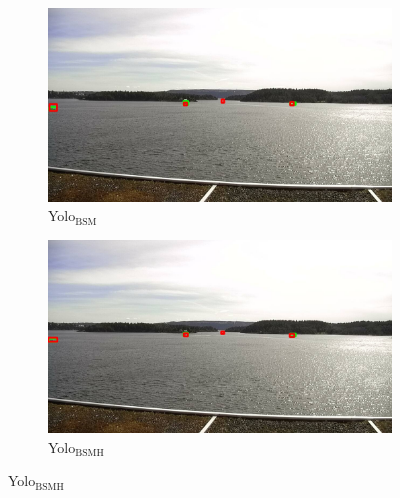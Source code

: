 \begin{figure}[h!]
\begin{subfigure}{.5\textwidth}
  \centering
  \includegraphics[width=0.9\linewidth]{results/case_buildings/yolo23/samemistake/yolo2/selected_08_07_frame10455.jpg}
  \caption{Yolo$_{\text{BSM}}$}
\end{subfigure}%
\begin{subfigure}{.5\textwidth}
  \centering
  \includegraphics[width=.9\linewidth]{results/case_buildings/yolo23/samemistake/yolo3/selected_08_07_frame10455.jpg}
  \caption{Yolo$_{\text{BSMH}}$}
\end{subfigure}


\end{figure}
